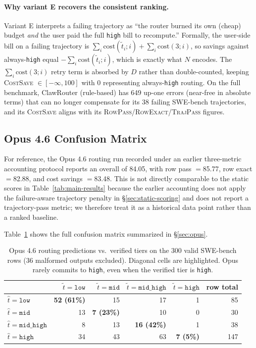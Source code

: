 \paragraph{Why variant E recovers the consistent ranking.}
Variant E interprets a failing trajectory as ``the router burned its own (cheap) budget \emph{and} the user paid the full \texttt{high} bill to recompute.'' Formally, the user-side bill on a failing trajectory is $\sum_i \mathrm{cost}(\tilde{t}_i;i) + \sum_i \mathrm{cost}(3;i)$, so savings against always-\texttt{high} equal $-\sum_i \mathrm{cost}(\tilde{t}_i;i)$, which is exactly what $N$ encodes. The $\sum_i \mathrm{cost}(3;i)$ retry term is absorbed by $D$ rather than double-counted, keeping \textsc{CostSave} $\in [-\infty, 100]$ with $0$ representing always-\texttt{high} routing. On the full benchmark, ClawRouter (rule-based) has 649 up-one errors (near-free in absolute terms) that can no longer compensate for its 38 failing SWE-bench trajectories, and its \textsc{CostSave} aligns with its \textsc{RowPass}/\textsc{RowExact}/\textsc{TrajPass} figures.

\subsection{Opus 4.6 Confusion Matrix}
\label{app:opus-confusion}

For reference, the Opus 4.6 routing run recorded under an earlier three-metric accounting protocol reports an overall of 84.05, with row pass $=$85.77, row exact $=$82.88, and cost savings $=$83.48. This is not directly comparable to the static scores in Table~\ref{tab:main-results} because the earlier accounting does not apply the failure-aware trajectory penalty in \S\ref{sec:static-scoring} and does not report a trajectory-pass metric; we therefore treat it as a historical data point rather than a ranked baseline.

Table~\ref{tab:opus-confusion} shows the full confusion matrix summarized in \S\ref{sec:opus}.

\begin{table}[ht]
\centering
\small
\caption{Opus 4.6 routing predictions vs.\ verified tiers on the 300 valid SWE-bench rows
(36 malformed outputs excluded). Diagonal cells are highlighted. Opus rarely commits to
\texttt{high}, even when the verified tier is \texttt{high}.}
\label{tab:opus-confusion}
\begin{tabular}{lrrrrr}
\toprule
 & $\tilde{t}=\texttt{low}$ & $\tilde{t}=\texttt{mid}$ & $\tilde{t}=\texttt{mid\_high}$ & $\tilde{t}=\texttt{high}$ & row total \\
\midrule
$\hat{t}=\texttt{low}$       & \textbf{52 (61\%)} & 15 & 17 & 1 & 85 \\
$\hat{t}=\texttt{mid}$       & 13 & \textbf{7 (23\%)} & 10 & 0 & 30 \\
$\hat{t}=\texttt{mid\_high}$ & 8  & 13 & \textbf{16 (42\%)} & 1 & 38 \\
$\hat{t}=\texttt{high}$      & 34 & 43 & 63 & \textbf{7 (5\%)} & 147 \\
\bottomrule
\end{tabular}
\end{table}

